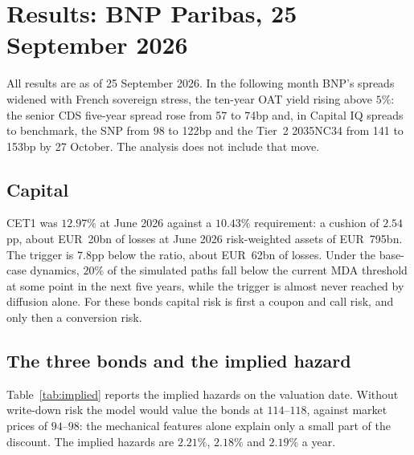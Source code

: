 \section{Results: BNP Paribas, 25 September 2026}\label{sec:results}

All results are as of 25 September 2026. In the following month BNP's spreads widened
with French sovereign stress, the ten-year OAT yield rising above $5\%$: the senior CDS
five-year spread rose from 57 to 74bp and, in Capital IQ spreads to benchmark, the SNP from
98 to 122bp and the Tier~2 2035NC34 from 141 to 153bp by 27 October. The analysis does not
include that move.

\subsection{Capital}

CET1 was $12.97\%$ at June 2026 against a $10.43\%$ requirement: a cushion of $2.54$pp, about
EUR~20bn of losses at June 2026 risk-weighted assets of EUR~795bn. The trigger is $7.8$pp
below the ratio, about EUR~62bn of losses. Under the base-case dynamics, $20\%$ of the
simulated paths fall below the current MDA threshold at some point in the next five
years, while the trigger is almost never reached by diffusion alone. For these bonds
capital risk is first a coupon and call risk, and only then a conversion risk.

\subsection{The three bonds and the implied hazard}

Table~\ref{tab:implied} reports the implied hazards on the valuation date. Without
write-down risk the model would value the bonds at $114$--$118$, against market prices of
$94$--$98$: the mechanical features alone explain only a small part of the discount. The
implied hazards are $2.21\%$, $2.18\%$ and $2.19\%$ a year.

